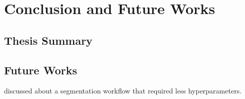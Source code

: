 \chapter{Conclusion and Future Works}

\section{Thesis Summary}



\section{Future Works}

\cite{6346433} discussed about a segmentation workflow that required less hyperparameters.